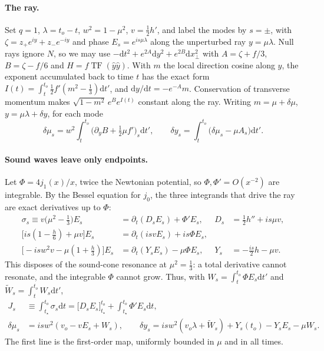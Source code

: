 \documentclass[10pt]{article}
\newcommand{\dd}{\mathrm{d}}
\newcommand{\TF}{\operatorname{TF}}
\begin{document}
\paragraph{The ray.} Set $q=1$, $\lambda=t_o-t$, $w^2=1-\mu^2$, $v=\frac12h'$, and label the modes by $s=\pm$, with $\zeta=z_+e^{iy}+z_-e^{-iy}$ and phase $E_s=e^{is\mu\lambda}$ along the unperturbed ray $y=\mu\lambda$. Null rays ignore $N$, so we may use $-\dd t^2+e^{2A}\dd y^2+e^{2B}\dd x_\perp^2$ with $A=\zeta+f/3$, $B=\zeta-f/6$ and $H=f\TF(\hat y\hat y)$. With $m$ the local direction cosine along $y$, the exponent accumulated back to time $t$ has the exact form $I(t)=\int_t^{t_o}\frac12f'(m^2-\frac13)\dd t'$, and $\dd y/\dd t=-e^{-A}m$. Conservation of transverse momentum makes $\sqrt{1-m^2}\,e^{B}e^{I(t)}$ constant along the ray. Writing $m=\mu+\delta\mu$, $y=\mu\lambda+\delta y$, for each mode
\begin{equation}\label{eq:deflect}
\delta\mu_s=w^2\!\int_t^{t_o}\!\big(\partial_yB+\tfrac12\mu f'\big)_s\dd t',\qquad
\delta y_s=\int_t^{t_o}\!\big(\delta\mu_s-\mu A_s\big)\dd t'.
\end{equation}

\paragraph{Sound waves leave only endpoints.} Let $\Phi=4j_1(x)/x$, twice the Newtonian potential, so $\Phi,\Phi'=O(x^{-2})$ are integrable. By the Bessel equation for $j_0$, the three integrands that drive the ray are exact derivatives up to $\Phi$:
\begin{equation}\label{eq:ids}
\begin{aligned}
\sigma_s\equiv v\big(\mu^2-\tfrac13\big)E_s&=\partial_t(D_sE_s)+\Phi'E_s, &D_s&=\tfrac12h''+is\mu v,\\
\big[is(1-\tfrac h6)+\mu v\big]E_s&=\partial_t(isvE_s)+is\Phi E_s,\\
\big[-isw^2v-\mu(1+\tfrac h3)\big]E_s&=\partial_t(Y_sE_s)-\mu\Phi E_s, &Y_s&=-\tfrac{is}2h-\mu v.
\end{aligned}
\end{equation}
This disposes of the sound-cone resonance at $\mu^2=\frac13$: a total derivative cannot resonate, and the integrable $\Phi$ cannot grow. Thus, with $W_s=\int_t^{t_o}\Phi E_s\dd t'$ and $\widetilde W_s=\int_t^{t_o}W_s\dd t'$,
\begin{equation}\label{eq:J}
\begin{aligned}
J_s&\equiv\int_{t_\star}^{t_o}\sigma_s\dd t=\big[D_sE_s\big]_{t_\star}^{t_o}+\int_{t_\star}^{t_o}\Phi'E_s\dd t,\\
\delta\mu_s&=isw^2(v_o-vE_s+W_s),\qquad
\delta y_s=isw^2(v_o\lambda+\widetilde W_s)+Y_s(t_o)-Y_sE_s-\mu W_s.
\end{aligned}
\end{equation}
The first line is the first-order map, uniformly bounded in $\mu$ and in all times.
\end{document}
